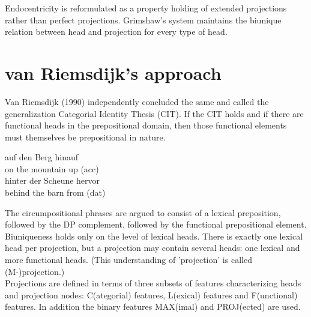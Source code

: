 \documentclass{article}
\begin{document}
Endocentricity is reformulated as a property holding of extended projections rather than perfect projections. 
Grimshaw's system maintains the biunique relation between head and projection for every type of head. 

\section{van Riemsdijk's approach}
Van Riemsdijk (1990) independently concluded the same and called the generalization Categorial Identity Thesis (CIT).
If the CIT holds and if there are functional heads in the prepositional domain, then those functional elements must themselves be prepositional in nature. 

\begin{example}
\label{German circum-and postpositional constructions}
   \gll 
 auf den Berg hinauf\\ 
on the mountain up (acc)\\
   	\gll 
	hinter der Scheune hervor\\
	behind the barn from (dat)\\

	\glt
	\glend
   \end{example}

The circumpositional phrases are argued to consist of a lexical preposition, followed by the DP complement, followed by the functional prepositional element.\\
Biuniqueness holds only on the level of lexical heads. There is exactly one lexical head per projection, but a projection may contain several heads: one lexical and more functional heads. (This understanding of 'projection' is called (M-)projection.)\\
Projections are defined in terms of three subsets of features characterizing heads and projection nodes: C(ategorial) features, L(exical) features and F(unctional) features. In addition the binary features MAX(imal) and PROJ(ected) are used.
\end{document}
